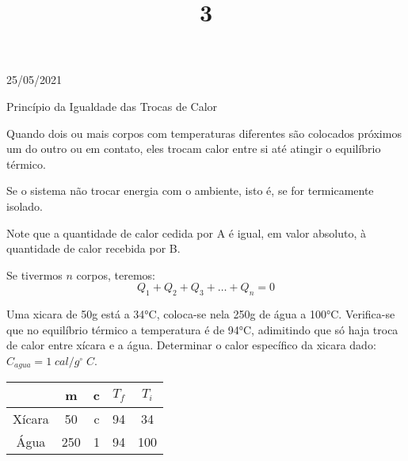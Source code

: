 \documentclass{SchoolBook}
\begin{document}
\begin{day}{25/05/2021}
        \title{3}{Princípio da Igualdade das Trocas de Calor}
        
        Quando dois ou mais corpos com temperaturas diferentes são colocados próximos um do outro ou em contato, eles trocam calor entre si até atingir o equilíbrio térmico.
        
        Se o sistema não trocar energia com o ambiente, isto é, se for termicamente isolado.
        
        Note que a quantidade de calor cedida por A é igual, em valor absoluto, à quantidade de calor recebida por B.
        
        Se tivermos $n$ corpos, teremos:
        $$ Q_1 + Q_2 + Q_3 + \dots + Q_n = 0 $$
        
        Uma xicara de 50g está a 34°C, coloca-se nela 250g de água a 100°C. Verifica-se que no equilíbrio térmico a temperatura é de 94°C, adimitindo que só haja troca de calor entre xícara e a água. Determinar o calor específico da xicara dado: $C_{agua} = 1\;cal/g^\circ\;C$.
        \begin{center}
            \vspace{6pt}
            \begin{tabular}{|c|c|c|c|c|}\hline
                       & m   & c & $T_f$ & $T_i$ \\\hline
                Xícara & 50  & c & 94    & 34    \\\hline
                Água   & 250 & 1 & 94    & 100   \\\hline
            \end{tabular}
        \end{center}
    \end{day}
    
\end{document}
